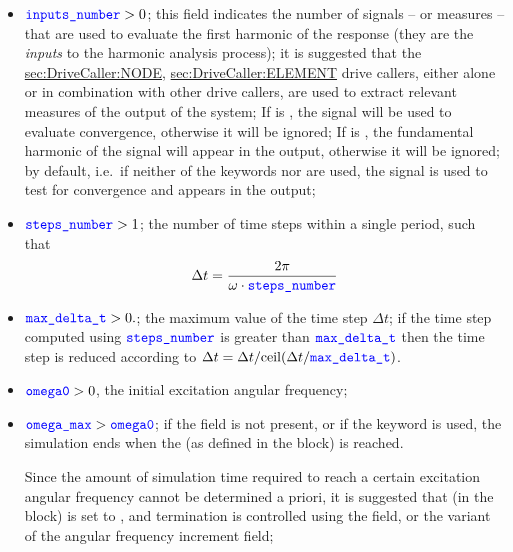 \begin{itemize}
\item $\textcolor{blue}{\texttt{inputs\_number}} > 0$;
this field indicates the number of signals -- or measures -- that are used to evaluate the first harmonic of the response
(they are the \emph{inputs} to the harmonic analysis process);
it is suggested that the
\hyperref{\kw{node}}{\kw{node} (see Section~}{)}{sec:DriveCaller:NODE},
\hyperref{\kw{element}}{\kw{element} (see Section~}{)}{sec:DriveCaller:ELEMENT}
drive callers, either alone or in combination with other drive callers, are used to extract relevant measures of the output of the system;
If  is , the signal will be used to evaluate convergence, otherwise it will be ignored;
If  is , the fundamental harmonic of the signal will appear in the output, otherwise it will be ignored;
by default, i.e.\ if neither of the keywords  nor  are used, the signal is used to test for convergence and appears in the output;

\item $\textcolor{blue}{\texttt{steps\_number}} > 1$; the number of time steps within a single period, such that
\begin{align*}
	\Delta t = \frac{2 \pi}{\omega \cdot \textcolor{blue}{\texttt{steps\_number}}}
\end{align*}

\item $\textcolor{blue}{\texttt{max\_delta\_t}} > 0.$; the maximum value of the time step $\Delta t$; 
if the time step computed using $\textcolor{blue}{\texttt{steps\_number}}$ is greater
than $\textcolor{blue}{\texttt{max\_delta\_t}}$ then the time step is reduced according to 
$\Delta t = \Delta t / \mathrm{ceil}(\Delta t / \textcolor{blue}{\texttt{max\_delta\_t}})$.

\item $\textcolor{blue}{\texttt{omega0}} > 0$, the initial excitation angular frequency;

\item $\textcolor{blue}{\texttt{omega\_max}} > \textcolor{blue}{\texttt{omega0}}$; if the  field is not present, or if the keyword  is used, the simulation ends when the  (as defined in the  block) is reached.

Since the amount of simulation time required to reach a certain excitation angular frequency cannot be determined a priori, it is suggested that  (in the  block) is set to , and termination is controlled using the  field, or the  variant of the angular frequency increment field;


\end{itemize}
